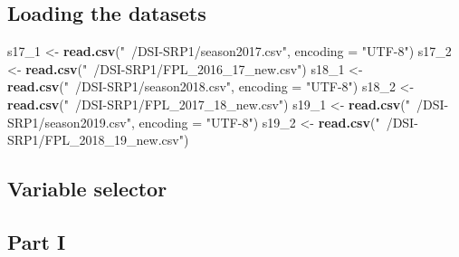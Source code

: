 \documentclass[]{article}
\newenvironment{Shaded}{\begin{snugshade}}{\end{snugshade}}
\newcommand{\ControlFlowTok}[1]{\textcolor[rgb]{0.13,0.29,0.53}{\textbf{#1}}}
\newcommand{\DataTypeTok}[1]{\textcolor[rgb]{0.13,0.29,0.53}{#1}}
\newcommand{\DecValTok}[1]{\textcolor[rgb]{0.00,0.00,0.81}{#1}}
\newcommand{\KeywordTok}[1]{\textcolor[rgb]{0.13,0.29,0.53}{\textbf{#1}}}
\newcommand{\NormalTok}[1]{#1}
\newcommand{\OperatorTok}[1]{\textcolor[rgb]{0.81,0.36,0.00}{\textbf{#1}}}
\newcommand{\StringTok}[1]{\textcolor[rgb]{0.31,0.60,0.02}{#1}}
\begin{document}
\hypertarget{loading-the-datasets}{%
\subsection{Loading the datasets}\label{loading-the-datasets}}

\begin{Shaded}
\begin{Highlighting}[]
\NormalTok{s17_}\DecValTok{1}\NormalTok{ <-}\StringTok{ }\KeywordTok{read.csv}\NormalTok{(}\StringTok{"~/DSI-SRP1/season2017.csv"}\NormalTok{, }\DataTypeTok{encoding =} \StringTok{"UTF-8"}\NormalTok{)}
\NormalTok{s17_}\DecValTok{2}\NormalTok{ <-}\StringTok{ }\KeywordTok{read.csv}\NormalTok{(}\StringTok{"~/DSI-SRP1/FPL_2016_17_new.csv"}\NormalTok{)}
\NormalTok{s18_}\DecValTok{1}\NormalTok{ <-}\StringTok{ }\KeywordTok{read.csv}\NormalTok{(}\StringTok{"~/DSI-SRP1/season2018.csv"}\NormalTok{, }\DataTypeTok{encoding =} \StringTok{"UTF-8"}\NormalTok{)}
\NormalTok{s18_}\DecValTok{2}\NormalTok{ <-}\StringTok{ }\KeywordTok{read.csv}\NormalTok{(}\StringTok{"~/DSI-SRP1/FPL_2017_18_new.csv"}\NormalTok{)}
\NormalTok{s19_}\DecValTok{1}\NormalTok{ <-}\StringTok{ }\KeywordTok{read.csv}\NormalTok{(}\StringTok{"~/DSI-SRP1/season2019.csv"}\NormalTok{, }\DataTypeTok{encoding =} \StringTok{"UTF-8"}\NormalTok{)}
\NormalTok{s19_}\DecValTok{2}\NormalTok{ <-}\StringTok{ }\KeywordTok{read.csv}\NormalTok{(}\StringTok{"~/DSI-SRP1/FPL_2018_19_new.csv"}\NormalTok{)}
\end{Highlighting}
\end{Shaded}

\hypertarget{variable-selector}{%
\subsection{Variable selector}\label{variable-selector}}

\begin{Shaded}
\end{Shaded}

\hypertarget{part-i}{%
\subsection{Part I}\label{part-i}}
\end{document}
